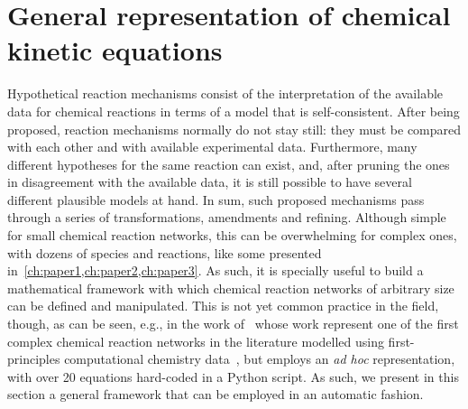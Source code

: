 \section{General representation of chemical kinetic equations}%
\label{sec:kin-repr}

Hypothetical reaction mechanisms consist of
the interpretation of the available data for chemical reactions
in terms of a model that is self-consistent.
After being proposed,
reaction mechanisms normally do not stay still:
they must be compared
with each other
and with available experimental data.
Furthermore,
many different hypotheses for the same reaction can exist,
and,
after pruning the ones in disagreement with the available data,
it is still possible to have several different plausible models at hand.
In sum,
such proposed mechanisms pass through a series of transformations,
amendments and refining.
Although simple for small chemical reaction networks,
this can be overwhelming for complex ones,
with dozens of species and reactions,
like some presented in~\cref{ch:paper1,ch:paper2,ch:paper3}.
As such,
it is specially useful to build a mathematical framework with which
chemical reaction networks of arbitrary size can be defined and manipulated.
This is not yet common practice in the field,
though,
as can be seen,
e.g.,
in the work of~\citeauthor{P_rez_Soto_2020}
whose work represent one of the first
complex chemical reaction networks in the literature
modelled using first-principles computational chemistry data~\cite{P_rez_Soto_2020},
but employs an \emph{ad hoc} representation,
with over 20 equations hard-coded in a Python script.
As such,
we present in this section a general framework that can be employed in an automatic fashion.

